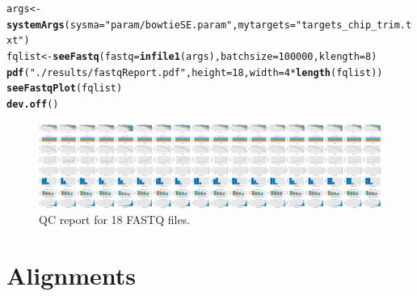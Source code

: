 \documentclass{article}\usepackage[]{graphicx}\usepackage[]{color}
\makeatletter
\newcommand{\hlnum}[1]{\textcolor[rgb]{0.686,0.059,0.569}{#1}}%
\newcommand{\hlstr}[1]{\textcolor[rgb]{0.192,0.494,0.8}{#1}}%
\newcommand{\hlopt}[1]{\textcolor[rgb]{0,0,0}{#1}}%
\newcommand{\hlstd}[1]{\textcolor[rgb]{0.345,0.345,0.345}{#1}}%
\newcommand{\hlkwb}[1]{\textcolor[rgb]{0.69,0.353,0.396}{#1}}%
\newcommand{\hlkwc}[1]{\textcolor[rgb]{0.333,0.667,0.333}{#1}}%
\newcommand{\hlkwd}[1]{\textcolor[rgb]{0.737,0.353,0.396}{\textbf{#1}}}%
\newenvironment{kframe}{%
 \def\at@end@of@kframe{}%
 \ifinner\ifhmode%
  \def\at@end@of@kframe{\end{minipage}}%
  \begin{minipage}{\columnwidth}%
 \fi\fi%
 \def\FrameCommand##1{\hskip\@totalleftmargin \hskip-\fboxsep
 \colorbox{shadecolor}{##1}\hskip-\fboxsep
     \hskip-\linewidth \hskip-\@totalleftmargin \hskip\columnwidth}%
 \MakeFramed {\advance\hsize-\width
   \@totalleftmargin\z@ \linewidth\hsize
   \@setminipage}}%
 {\par\unskip\endMakeFramed%
 \at@end@of@kframe}
\newenvironment{knitrout}{}{} %
\makeatother
\begin{document}
\begin{knitrout}
\color{fgcolor}\begin{kframe}
\begin{alltt}
\hlstd{args} \hlkwb{<-} \hlkwd{systemArgs}\hlstd{(}\hlkwc{sysma}\hlstd{=}\hlstr{"param/bowtieSE.param"}\hlstd{,} \hlkwc{mytargets}\hlstd{=}\hlstr{"targets_chip_trim.txt"}\hlstd{)}
\hlstd{fqlist} \hlkwb{<-} \hlkwd{seeFastq}\hlstd{(}\hlkwc{fastq}\hlstd{=}\hlkwd{infile1}\hlstd{(args),} \hlkwc{batchsize}\hlstd{=}\hlnum{100000}\hlstd{,} \hlkwc{klength}\hlstd{=}\hlnum{8}\hlstd{)}
\hlkwd{pdf}\hlstd{(}\hlstr{"./results/fastqReport.pdf"}\hlstd{,} \hlkwc{height}\hlstd{=}\hlnum{18}\hlstd{,} \hlkwc{width}\hlstd{=}\hlnum{4}\hlopt{*}\hlkwd{length}\hlstd{(fqlist))}
\hlkwd{seeFastqPlot}\hlstd{(fqlist)}
\hlkwd{dev.off}\hlstd{()}
\end{alltt}
\end{kframe}
\end{knitrout}
\begin{figure}[H]
  \centering
   \includegraphics[width=18cm]{fastqReport.pdf}
   \caption{QC report for 18 FASTQ files.}
   \label{fig:fastqreport}
\end{figure}

\section{Alignments}
\end{document}

